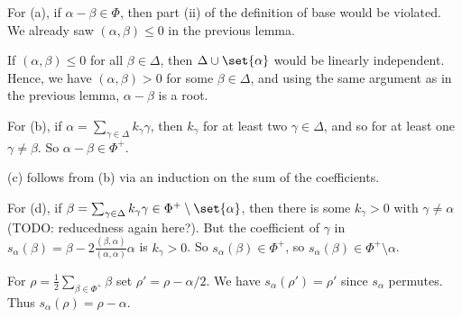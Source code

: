 For (a), if  $\alpha - \beta \in \Phi$, then part (ii) of the definition of base
would be violated. We already saw $(\alpha, \beta) \leq 0$ in the previous lemma.

If $(\alpha, \beta)\leq 0 $ for all $\beta \in \Delta$, then $\Delta \cup \set{\alpha}$
would be linearly independent. Hence, we have $(\alpha, \beta) > 0$ for
some $\beta \in \Delta$, and using the same argument as in the previous
lemma, $\alpha - \beta$ is a root.

For (b), if $\alpha = \sum_{\gamma \in \Delta} k_{\gamma}\gamma$, then $k_\gamma$ for
at least two $\gamma \in \Delta$, and so for at least one $\gamma \neq \beta$. So
$\alpha - \beta \in \Phi^+$.

(c) follows from (b) via an induction on the sum of the coefficients.

For (d), if $\beta = \sum_{\gamma \in\Delta} k_{\gamma}\gamma \in \Phi^+\setminus\set{\alpha}$,
then there is some $k_\gamma > 0$ with $\gamma\neq \alpha$ (TODO: reducedness again
here?). But the coefficient of $\gamma$ in $s_\alpha(\beta) = \beta - 2\frac{(\beta, \alpha)}{(\alpha, \alpha)}\alpha$
is $k_\gamma >0$. So $s_\alpha(\beta) \in \Phi^+$, so $s_\alpha(\beta) \in \Phi^+\setminus{\alpha}$.

For $\rho = \frac{1}{2}\sum_{\beta \in \Phi^+}\beta$ set $\rho' = \rho - \alpha/2$.
We have $s_\alpha(\rho') = \rho'$ since $s_\alpha$ permutes. Thus
$s_\alpha(\rho) = \rho - \alpha$.
